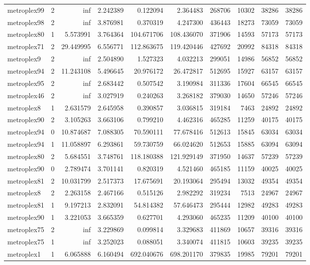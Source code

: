 \begin{longtable}{|l|r|r|r|r|r|r|r|r|r|}
metroplex99 & 2 & inf & 2.242389 & 0.122094 & 2.364483 & 268706 & 10302 & 38286 & 38286 \\
metroplex98 & 2 & inf & 3.876981 & 0.370319 & 4.247300 & 436443 & 18273 & 73059 & 73059 \\
metroplex80 & 1 & 5.573991 & 3.764364 & 104.671706 & 108.436070 & 371906 & 14593 & 57173 & 57173 \\
metroplex71 & 2 & 29.449995 & 6.556771 & 112.863675 & 119.420446 & 427692 & 20992 & 84318 & 84318 \\
metroplex9 & 2 & inf & 2.504890 & 1.527323 & 4.032213 & 299051 & 14986 & 56852 & 56852 \\
metroplex94 & 2 & 11.243108 & 5.496645 & 20.976172 & 26.472817 & 512695 & 15927 & 63157 & 63157 \\
metroplex95 & 2 & inf & 2.683442 & 0.507542 & 3.190984 & 311336 & 17604 & 66545 & 66545 \\
metroplex46 & 2 & inf & 3.027919 & 0.240263 & 3.268182 & 379030 & 14650 & 57246 & 57246 \\
metroplex8 & 1 & 2.631579 & 2.645958 & 0.390857 & 3.036815 & 319184 & 7463 & 24892 & 24892 \\
metroplex90 & 2 & 3.105263 & 3.663106 & 0.799210 & 4.462316 & 465285 & 11259 & 40175 & 40175 \\
metroplex94 & 0 & 10.874687 & 7.088305 & 70.590111 & 77.678416 & 512613 & 15845 & 63034 & 63034 \\
metroplex94 & 1 & 11.058897 & 6.293861 & 59.730759 & 66.024620 & 512653 & 15885 & 63094 & 63094 \\
metroplex80 & 2 & 5.684551 & 3.748761 & 118.180388 & 121.929149 & 371950 & 14637 & 57239 & 57239 \\
metroplex90 & 0 & 2.789474 & 3.701141 & 0.820319 & 4.521460 & 465185 & 11159 & 40025 & 40025 \\
metroplex81 & 2 & 10.031799 & 2.517373 & 17.675691 & 20.193064 & 295494 & 13032 & 49354 & 49354 \\
metroplex8 & 2 & 2.263158 & 2.467166 & 0.515126 & 2.982292 & 319234 & 7513 & 24967 & 24967 \\
metroplex81 & 1 & 9.197213 & 2.832091 & 54.814382 & 57.646473 & 295444 & 12982 & 49283 & 49283 \\
metroplex90 & 1 & 3.221053 & 3.665359 & 0.627701 & 4.293060 & 465235 & 11209 & 40100 & 40100 \\
metroplex75 & 2 & inf & 3.229869 & 0.099814 & 3.329683 & 411869 & 10657 & 39316 & 39316 \\
metroplex75 & 1 & inf & 3.252023 & 0.088051 & 3.340074 & 411815 & 10603 & 39235 & 39235 \\
metroplex1 & 1 & 6.065888 & 6.160494 & 692.040676 & 698.201170 & 379835 & 19985 & 79201 & 79201 \\
\end{longtable}
